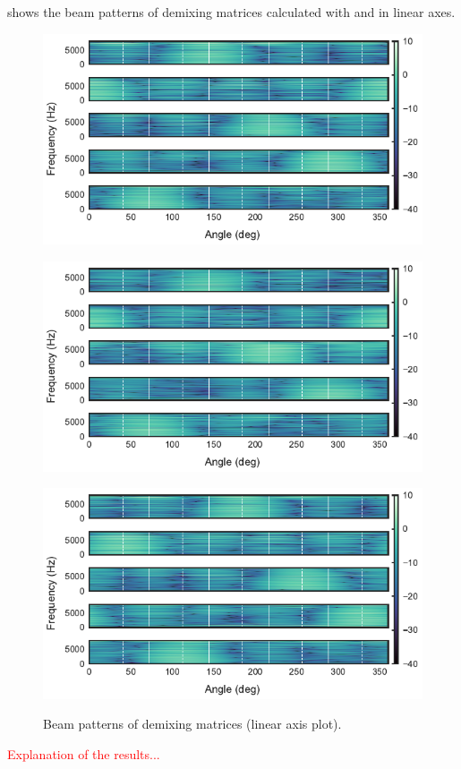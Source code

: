 \documentclass[sip,biber]{now-journal}
\newcommand{\todo}[1]{\textcolor{red}{#1}}
\begin{document}
 shows the beam patterns of demixing matrices calculated with \RTObs{} and \RTCov{} in linear axes.
\begin{figure}[t]
  \begin{minipage}[t]{\linewidth}
    \centering\includegraphics{figures/plots/beam-pattern/linear_RTcov_ref.pdf}\label{fig:plot:bp:lin:ref}
  \end{minipage}
  \begin{minipage}[t]{\linewidth}
    \centering\includegraphics{figures/plots/beam-pattern/linear_RTcov_rot.pdf}\label{fig:plot:bp:lin:cov}
  \end{minipage}
  \begin{minipage}[t]{\linewidth}
    \centering\includegraphics{figures/plots/beam-pattern/linear_RTobs_rot.pdf}\label{fig:plot:bp:lin:obs}
  \end{minipage}
  \caption{Beam patterns of demixing matrices (linear axis plot).}%
  \label{fig:plots:bp:lin}
\end{figure}
\todo{Explanation of the results...}
\end{document}
